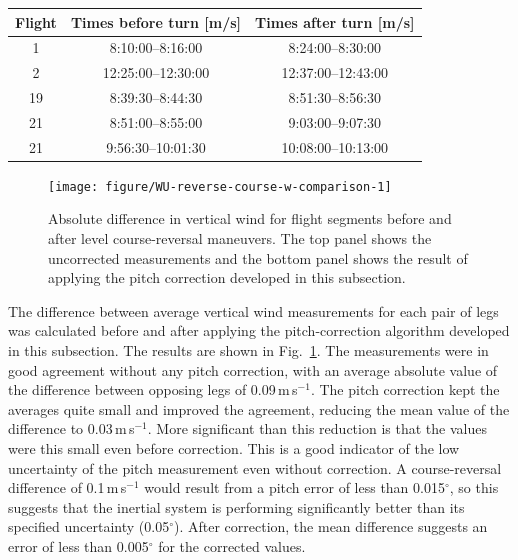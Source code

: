 \documentclass[12pt,twoside,english]{article}\usepackage[]{graphicx}\usepackage[]{color}
\newenvironment{knitrout}{}{} %
\providecommand{\tabularnewline}{\\}
\begin{document}
\begin{minipage}[t]{1\columnwidth}%
\hskip1in%
\begin{tabular}{|c|c|c|}
\hline 
\textbf{Flight}  &
\textbf{Times before turn [m/s]}  &
\textbf{Times after turn [m/s]}\tabularnewline
\hline 
\hline 
1  &
8:10:00--8:16:00  &
8:24:00--8:30:00\tabularnewline
\hline 
2  &
12:25:00--12:30:00  &
12:37:00--12:43:00\tabularnewline
\hline 
19  &
8:39:30--8:44:30  &
8:51:30--8:56:30\tabularnewline
\hline 
21  &
8:51:00--8:55:00  &
9:03:00--9:07:30\tabularnewline
\hline 
21  &
9:56:30--10:01:30  &
10:08:00--10:13:00\tabularnewline
\hline 
\end{tabular}%
\end{minipage}




\begin{knitrout}\footnotesize
{}\color{fgcolor}\begin{figure}

{\centering \texttt{[image: figure/WU-reverse-course-w-comparison-1]} 

}

\caption[Absolute difference in vertical wind for flight segments before and after level course-reversal maneuvers]{Absolute difference in vertical wind for flight segments before and after level course-reversal maneuvers. The top panel shows the uncorrected measurements and the bottom panel shows the result of applying the pitch correction developed in this subsection.}\label{fig:reverse-course-w-comparison}
\end{figure}


\end{knitrout}

The difference between average vertical wind measurements for each  pair of legs was calculated before and after applying the pitch-correction  algorithm developed in this subsection. The results are shown in Fig.~\ref{fig:reverse-course-w-comparison}. The measurements were in good agreement without any pitch correction, with an average absolute value of the difference between opposing legs of 0.09\,m\,s$^{-1}$. The pitch correction kept the averages quite small and improved the agreement, reducing the mean value of the difference to 0.03\,m\,s$^{-1}$. More significant than this reduction is that the values were this small even before correction. This is a good indicator of the low uncertainty of the pitch measurement even without correction. A course-reversal difference of 0.1\,m\,s$^{-1}$ would result from a pitch error  of less than 0.015$^{\circ}$, so this suggests that the inertial system is performing significantly better than its specified uncertainty (0.05$^{\circ}$). After correction, the mean difference suggests an error of less than 0.005$^{\circ}$ for the corrected values. 
\end{document}
